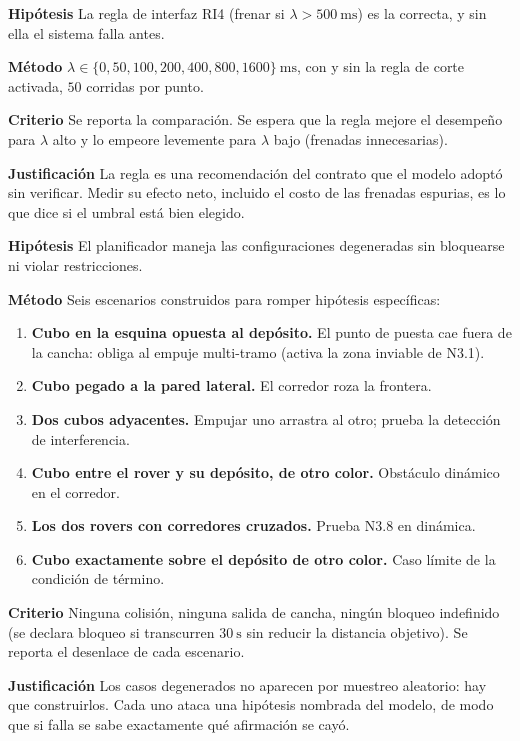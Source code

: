 \documentclass[11pt,a4paper]{article}
\newenvironment{prueba}[2]{%
  \par\medskip\noindent
  \begin{tcolorbox}[enhanced,breakable,colback=white,colframe=black!45,
    boxrule=0.5pt,arc=1pt,left=6pt,right=6pt,top=4pt,bottom=4pt,
    title={\bfseries #1\quad\normalfont #2},
    colbacktitle=black!8,coltitle=black,fonttitle=\bfseries\small]
  \small
}{\end{tcolorbox}\par\medskip}
\newcommand{\campo}[1]{\par\smallskip\noindent\textbf{#1}\quad\ignorespaces}
\begin{document}
\begin{prueba}{N4.4}{Barrido de latencia}
\campo{Hipótesis} La regla de interfaz RI4 (frenar si $\lambda > 500\ \mathrm{ms}$) es
la correcta, y sin ella el sistema falla antes.
\campo{Método} $\lambda \in \{0, 50, 100, 200, 400, 800, 1600\}\ \mathrm{ms}$, con y sin
la regla de corte activada, $50$ corridas por punto.
\campo{Criterio} Se reporta la comparación. Se espera que la regla mejore el desempeño
para $\lambda$ alto y lo empeore levemente para $\lambda$ bajo (frenadas innecesarias).
\campo{Justificación} La regla es una recomendación del contrato que el modelo adoptó
sin verificar. Medir su efecto neto, incluido el costo de las frenadas espurias, es lo
que dice si el umbral está bien elegido.
\end{prueba}

\begin{prueba}{N4.5}{Escenarios adversarios}
\campo{Hipótesis} El planificador maneja las configuraciones degeneradas sin bloquearse
ni violar restricciones.
\campo{Método} Seis escenarios construidos para romper hipótesis específicas:
\begin{enumerate}[label=(\alph*),leftmargin=2em,itemsep=1pt,topsep=2pt]
\item \textbf{Cubo en la esquina opuesta al depósito.} El punto de puesta cae fuera de
      la cancha: obliga al empuje multi-tramo (activa la zona inviable de N3.1).
\item \textbf{Cubo pegado a la pared lateral.} El corredor roza la frontera.
\item \textbf{Dos cubos adyacentes.} Empujar uno arrastra al otro; prueba la
      detección de interferencia.
\item \textbf{Cubo entre el rover y su depósito, de otro color.} Obstáculo dinámico en
      el corredor.
\item \textbf{Los dos rovers con corredores cruzados.} Prueba N3.8 en dinámica.
\item \textbf{Cubo exactamente sobre el depósito de otro color.} Caso límite de la
      condición de término.
\end{enumerate}
\campo{Criterio} Ninguna colisión, ninguna salida de cancha, ningún bloqueo indefinido
(se declara bloqueo si transcurren $30\ \mathrm{s}$ sin reducir la distancia objetivo).
Se reporta el desenlace de cada escenario.
\campo{Justificación} Los casos degenerados no aparecen por muestreo aleatorio: hay que
construirlos. Cada uno ataca una hipótesis nombrada del modelo, de modo que si falla se
sabe exactamente qué afirmación se cayó.
\end{prueba}
\end{document}
